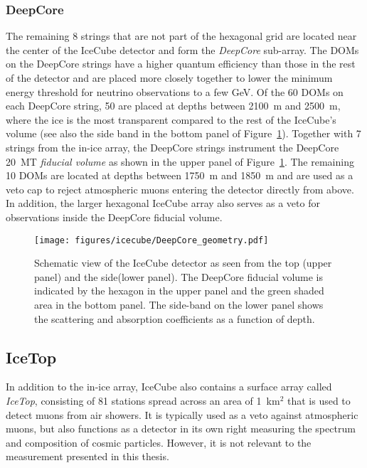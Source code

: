 \subsubsection{DeepCore}
The remaining 8 strings that are not part of the hexagonal grid are located near the center of the IceCube detector and form the \emph{DeepCore} sub-array.
The DOMs on the DeepCore strings have a higher quantum efficiency than those in the rest of the detector and are placed more closely together to lower the minimum energy threshold for neutrino observations to a few GeV.
Of the 60 DOMs on each DeepCore string, 50 are placed at depths between 2100~m and 2500~m, where the ice is the most transparent compared to the rest of the IceCube's volume (see also the side band in the bottom panel of Figure~\ref{fig:icecube-schematic}).
Together with 7 strings from the in-ice array, the DeepCore strings instrument the DeepCore 20~MT \emph{fiducial volume} as shown in the upper panel of Figure~\ref{fig:icecube-schematic}.
The remaining 10 DOMs are located at depths between 1750~m and 1850~m and are used as a veto cap to reject atmospheric muons entering the detector directly from above.
In addition, the larger hexagonal IceCube array also serves as a veto for observations inside the DeepCore fiducial volume.
\begin{figure}
    \texttt{[image: figures/icecube/DeepCore\_geometry.pdf]}
    \caption{Schematic view of the IceCube detector as seen from the top (upper panel) and the side(lower panel). The DeepCore fiducial volume is indicated by the hexagon in the upper panel and the green shaded area in the bottom panel. The side-band on the lower panel shows the scattering and absorption coefficients as a function of depth.}
    \label{fig:icecube-schematic}
\end{figure}

\subsection{IceTop}

In addition to the in-ice array, IceCube also contains a surface array called \emph{IceTop}, consisting of 81 stations spread across an area of 1~km$^2$ that is used to detect muons from air showers.
It is typically used as a veto against atmospheric muons, but also functions as a detector in its own right measuring the spectrum and composition of cosmic particles.
However, it is not relevant to the measurement presented in this thesis.

